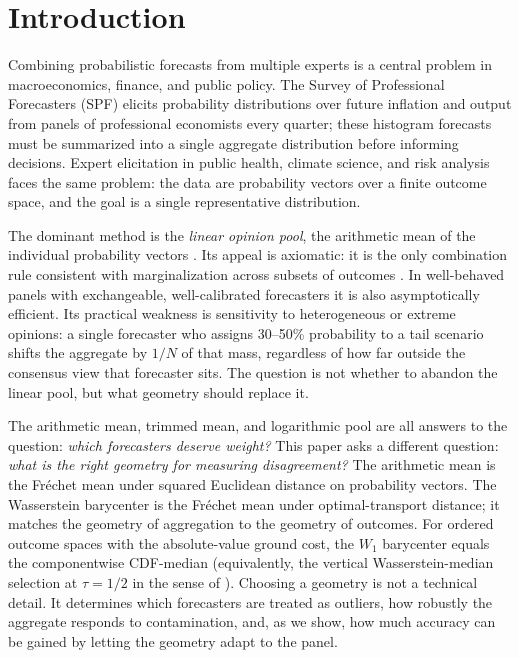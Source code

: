 \section{Introduction}

Combining probabilistic forecasts from multiple experts is a central problem in macroeconomics, finance, and public policy.  The Survey of Professional Forecasters (SPF) elicits probability distributions over future inflation and output from panels of professional economists every quarter; these histogram forecasts must be summarized into a single aggregate distribution before informing decisions.  Expert elicitation in public health, climate science, and risk analysis faces the same problem: the data are probability vectors over a finite outcome space, and the goal is a single representative distribution.

The dominant method is the \emph{linear opinion pool}, the arithmetic mean of the individual probability vectors \cite{genest86,ohagan06,timmermann06}.  Its appeal is axiomatic: it is the only combination rule consistent with marginalization across subsets of outcomes \cite{genest86}.  In well-behaved panels with exchangeable, well-calibrated forecasters it is also asymptotically efficient.  Its practical weakness is sensitivity to heterogeneous or extreme opinions: a single forecaster who assigns 30--50\% probability to a tail scenario shifts the aggregate by $1/N$ of that mass, regardless of how far outside the consensus view that forecaster sits.  The question is not whether to abandon the linear pool, but what geometry should replace it.

The arithmetic mean, trimmed mean, and logarithmic pool are all answers to the question: \emph{which forecasters deserve weight?}  This paper asks a different question: \emph{what is the right geometry for measuring disagreement?}  The arithmetic mean is the Fr\'echet mean under squared Euclidean distance on probability vectors.  The Wasserstein barycenter is the Fr\'echet mean under optimal-transport distance; it matches the geometry of aggregation to the geometry of outcomes.  For ordered outcome spaces with the absolute-value ground cost, the $W_1$ barycenter equals the componentwise CDF-median (equivalently, the vertical Wasserstein-median selection at $\tau = 1/2$ in the sense of \cite{carlier23}).  Choosing a geometry is not a technical detail.  It determines which forecasters are treated as outliers, how robustly the aggregate responds to contamination, and, as we show, how much accuracy can be gained by letting the geometry adapt to the panel.

